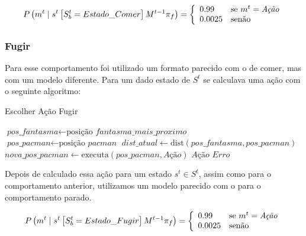 \begin{equation}
    P \left( m^t \mid s^t \left[ S_b^t = Estado\_Comer \right] M^{t-1} \pi_f \right) = 
        \left\{
            \begin{array}{l l}
                0.99 & \text{se }m^t = \textit{Ação} \\
                0.0025 & \text{senão}
            \end{array}
        \right.
\end{equation}

\subsubsection*{Fugir}

Para esse comportamento foi utilizado um formato parecido com o de comer, mas com um modelo diferente. Para um dado estado de $ S^t $ se calculava uma ação com o seguinte algoritmo:

\begin{algorithm}[H]
	\caption{Escolher Ação Fugir} \label{algorithm:SelecaoDeAcaoFugir}
	\begin{algorithmic}[1]
			\State $\textit{pos\_fantasma} \gets \text{posição }\textit{fantasma\_mais\_proximo} $
			\State $\textit{pos\_pacman} \gets \text{posição }\textit{pacman} $
			\State $\textit{dist\_atual} \gets \text{dist} \left( \textit{pos\_fantasma}, \textit{pos\_pacman} \right) $
				\State $\textit{nova\_pos\_pacman} \gets \text{executa} \left( \textit{pos\_pacman}, \textit{Ação} \right) $
					\State \Return $ \textit{Ação} $
				\EndIf 
			\EndFor
			\State \Return $ \textit{Erro} $
		\EndProcedure
	\end{algorithmic}
\end{algorithm}

Depois de calculado essa ação para um estado $ s^t \in S^t $, assim como para o comportamento anterior, utilizamos um modelo parecido com o para o comportamento parado.

\begin{equation}
    P \left( m^t \mid s^t \left[ S_b^t = Estado\_Fugir \right] M^{t-1} \pi_f \right) = 
        \left\{
            \begin{array}{l l}
                0.99 & \text{se }m^t = \textit{Ação} \\
                0.0025 & \text{senão}
            \end{array}
        \right.
\end{equation}

